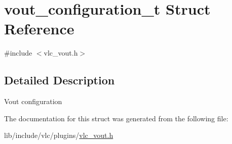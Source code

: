 \hypertarget{structvout__configuration__t}{}\section{vout\+\_\+configuration\+\_\+t Struct Reference}
\label{structvout__configuration__t}


{\ttfamily \#include $<$vlc\+\_\+vout.\+h$>$}



\subsection{Detailed Description}
Vout configuration 

The documentation for this struct was generated from the following file\+:\begin{DoxyCompactItemize}
\item 
lib/include/vlc/plugins/\hyperlink{vlc__vout_8h}{vlc\+\_\+vout.\+h}\end{DoxyCompactItemize}
